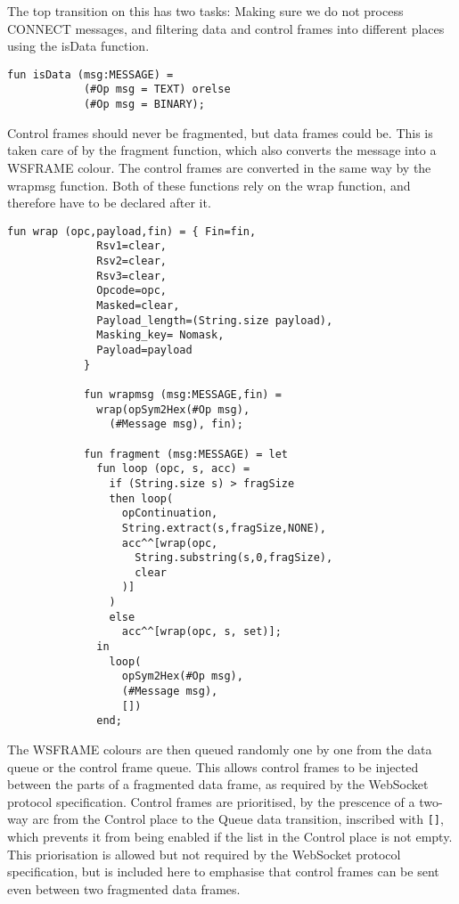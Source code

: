 			The top transition on this has two tasks: Making sure we do not process
			CONNECT messages, and filtering data and control frames into different
			places using the isData function. 
			
			\begin{lstlisting}[label=lst:isData,caption=isData,gobble=3]
			fun isData (msg:MESSAGE) =
			(#Op msg = TEXT) orelse
			(#Op msg = BINARY);
			\end{lstlisting}
			
			Control frames should never be fragmented, but data frames could be. This is
			taken care of by the fragment function, which also converts the message into
			a WSFRAME colour. The control frames are converted in the same way by the
			wrapmsg function. Both of these functions rely on the wrap function, and
			therefore have to be declared after it.
			
			
			\begin{lstlisting}[label=lst:fragment,caption=wrap wrapmsg and
			fragment,gobble=3]
			fun wrap (opc,payload,fin) = { Fin=fin,
			  Rsv1=clear,
			  Rsv2=clear,
			  Rsv3=clear,
			  Opcode=opc,
			  Masked=clear,
			  Payload_length=(String.size payload),
			  Masking_key= Nomask,
			  Payload=payload
			}
			
			fun wrapmsg (msg:MESSAGE,fin) = 
			  wrap(opSym2Hex(#Op msg), 
			    (#Message msg), fin);
			    
			fun fragment (msg:MESSAGE) = let
			  fun loop (opc, s, acc) = 
			    if (String.size s) > fragSize
			    then loop(
			      opContinuation,
			      String.extract(s,fragSize,NONE),
			      acc^^[wrap(opc, 
			        String.substring(s,0,fragSize), 
			        clear
			      )]
			    )
			    else 
			      acc^^[wrap(opc, s, set)];
			  in 
			    loop(
			      opSym2Hex(#Op msg), 
			      (#Message msg), 
			      [])
			  end;
			\end{lstlisting}
			
			The WSFRAME colours are then queued randomly one by one from the data queue or
			the control frame queue. This allows control frames to be injected between
			the parts of a fragmented data frame, as required by the WebSocket protocol
			specification. Control frames are prioritised, by the prescence of a
			two-way arc from the Control place to the Queue data transition, inscribed
			with \lstinline:[]:, which prevents it from being enabled if the list
			in the Control place is not empty. This priorisation is allowed but not
			required by the WebSocket protocol specification, but is included here to
			emphasise that control frames can be sent even between two fragmented data
			frames.
		
